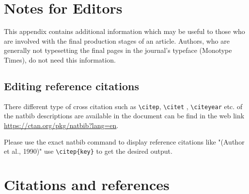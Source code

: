 \documentclass[lineno]{JFM-FLM_Au}
\begin{document}
\section{Notes for Editors}

This appendix contains additional information which may be useful to
those who are involved with the final production stages of an article.
Authors, who are generally not typesetting the final pages in the
journal's typeface (Monotype Times), do not need this information.


\subsection{Editing reference citations}

There different type of cross citation such as \verb"\citep",  \verb"\citet" , \verb"\citeyear"
etc. of the natbib descriptions are available in the document can be find in the web
link \url{https://ctan.org/pkg/natbib?lang=en}.

Please use the exact natbib command to display reference citations like \citep{Arntzenius2012} "(Author et al., 1990)" use \verb"\citep{key}" to get the desired output.

%
% 
% 



\section{Citations and references}
\end{document}
